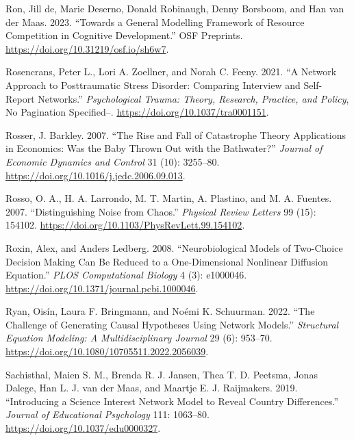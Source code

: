 \documentclass[
  letterpaper,
]{scrbook}
\newlength{\cslhangindent}
\newlength{\cslentryspacingunit} %
\newenvironment{CSLReferences}[2] %
 {%
  \setlength{\parindent}{0pt}
  \ifodd #1
  \let\oldpar\par
  \def\par{\hangindent=\cslhangindent\oldpar}
  \fi
  \setlength{\parskip}{#2\cslentryspacingunit}
 }%
 {}
\begin{document}
\begin{CSLReferences}{1}{0}
\leavevmode{}%
Ron, Jill de, Marie Deserno, Donald Robinaugh, Denny Borsboom, and Han
van der Maas. 2023. {``Towards a {General Modelling Framework} of
{Resource Competition} in {Cognitive Development}.''} {OSF Preprints}.
\url{https://doi.org/10.31219/osf.io/sh6w7}.

\leavevmode{}%
Rosencrans, Peter L., Lori A. Zoellner, and Norah C. Feeny. 2021. {``A
Network Approach to Posttraumatic Stress Disorder: {Comparing} Interview
and Self-Report Networks.''} \emph{Psychological Trauma: Theory,
Research, Practice, and Policy}, No Pagination Specified--.
\url{https://doi.org/10.1037/tra0001151}.

\leavevmode{}%
Rosser, J. Barkley. 2007. {``The Rise and Fall of Catastrophe Theory
Applications in Economics: {Was} the Baby Thrown Out with the
Bathwater?''} \emph{Journal of Economic Dynamics and Control} 31 (10):
3255--80. \url{https://doi.org/10.1016/j.jedc.2006.09.013}.

\leavevmode{}%
Rosso, O. A., H. A. Larrondo, M. T. Martin, A. Plastino, and M. A.
Fuentes. 2007. {``Distinguishing Noise from Chaos.''} \emph{Physical
Review Letters} 99 (15): 154102.
\url{https://doi.org/10.1103/PhysRevLett.99.154102}.

\leavevmode{}%
Roxin, Alex, and Anders Ledberg. 2008. {``Neurobiological {Models} of
{Two-Choice Decision Making Can Be Reduced} to a {One-Dimensional
Nonlinear Diffusion Equation}.''} \emph{PLOS Computational Biology} 4
(3): e1000046. \url{https://doi.org/10.1371/journal.pcbi.1000046}.

\leavevmode{}%
Ryan, Oisín, Laura F. Bringmann, and Noémi K. Schuurman. 2022. {``The
{Challenge} of {Generating Causal Hypotheses Using Network Models}.''}
\emph{Structural Equation Modeling: A Multidisciplinary Journal} 29 (6):
953--70. \url{https://doi.org/10.1080/10705511.2022.2056039}.

\leavevmode{}%
Sachisthal, Maien S. M., Brenda R. J. Jansen, Thea T. D. Peetsma, Jonas
Dalege, Han L. J. van der Maas, and Maartje E. J. Raijmakers. 2019.
{``Introducing a Science Interest Network Model to Reveal Country
Differences.''} \emph{Journal of Educational Psychology} 111: 1063--80.
\url{https://doi.org/10.1037/edu0000327}.


\end{CSLReferences}
\end{document}
